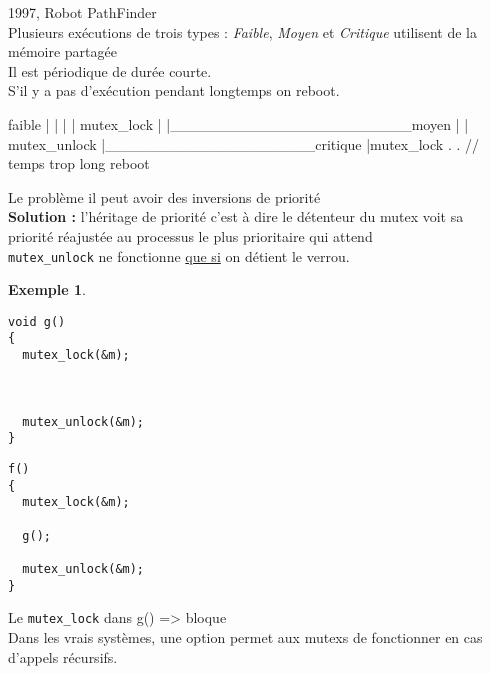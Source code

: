 \documentclass[12pt,a4paper]{report}
\newtheorem*{ex}{Exemple}
\begin{document}
1997, Robot PathFinder\\
Plusieurs exécutions de trois types : \emph{Faible}, \emph{Moyen} et \emph{Critique} utilisent de la mémoire partagée\\
Il est périodique de durée courte.\\
S'il y a pas d'exécution pendant longtemps on reboot.

\begin{verbatimtab}
faible
  |
  |
  |
  |
mutex_lock
  |
  |_______________________moyen
                            |
                            |
mutex_unlock                |____________________critique
                                                    |mutex_lock
													.
													.      // temps trop long
												reboot
\end{verbatimtab}

Le problème il peut avoir des inversions de priorité\\
\textbf{Solution :} l'héritage de priorité c'est à dire le détenteur du mutex voit sa priorité réajustée au processus le plus prioritaire qui attend\\






\verb?mutex_unlock? ne fonctionne \underline{que si} on détient le verrou.

\begin{ex}
\end{ex}
\medskip
\begin{minipage}{0.5\linewidth}
\begin{verbatim}
void g()
{
  mutex_lock(&m);



  mutex_unlock(&m);
}
\end{verbatim}
\end{minipage}
\begin{minipage}{0.5\linewidth}
\begin{verbatim}
f()
{
  mutex_lock(&m);

  g();

  mutex_unlock(&m);
}
\end{verbatim}
\end{minipage}

\bigskip

Le \verb?mutex_lock? dans g() => bloque\\
Dans les vrais systèmes, une option permet aux mutexs de fonctionner en cas d'appels récursifs.\\
\end{document}
